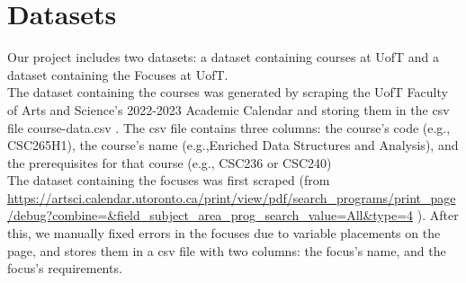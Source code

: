\documentclass[fontsize=11pt]{article}
\begin{document}
\section*{Datasets}
Our project includes two datasets: a dataset containing courses at UofT and a dataset containing the Focuses at UofT.\\
The dataset containing the courses was generated by scraping the UofT Faculty of Arts and Science's 2022-2023 Academic Calendar and storing them in the csv file course-data.csv . The csv file contains three columns: the course's code (e.g., CSC265H1), the course's name (e.g.,Enriched Data Structures and Analysis), and the prerequisites for that course (e.g., CSC236 or CSC240)
\\ The dataset containing the focuses was first scraped (from \url{https://artsci.calendar.utoronto.ca/print/view/pdf/search_programs/print_page/debug?combine=&field_subject_area_prog_search_value=All&type=4} ). After this, we manually fixed errors in the focuses due to variable placements on the page, and stores them in a csv file with two columns: the focus's name, and the focus's requirements.
\end{document}
